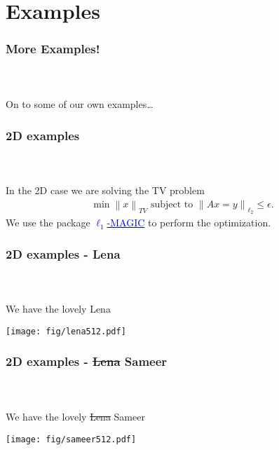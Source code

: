 \documentclass[mathserif,18pt,xcolor=table]{beamer}
\newcommand{\norm}[1]{\left\lVert #1 \right\rVert}
\begin{document}

\section{Examples}


\begin{frame}[t]
\frametitle{More Examples!}
\framesubtitle{~~}  %


On to some of our own examples\dots


\end{frame}




\begin{frame}[t]
\frametitle{2D examples}
\framesubtitle{~~}  %

In the 2D case we are solving the TV problem
\begin{align*}
	\min \norm{x}_{TV} \text{ subject to } \norm{Ax = y}_{\ell_2} \leq \epsilon.
\end{align*}
We use the package \href{http://users.ece.gatech.edu/~justin/l1magic/}{\textcolor{blue}{$\ell_1$-MAGIC}} to perform the optimization.

\end{frame}



\begin{frame}[t]
\frametitle{2D examples - Lena}
\framesubtitle{~~}  %

We have the lovely Lena

\centering
\texttt{[image: fig/lena512.pdf]}

\end{frame}

\begin{frame}[t]
	\frametitle{2D examples - \st{Lena} Sameer}
\framesubtitle{~~}  %

We have the lovely \st{Lena} Sameer

\centering
\texttt{[image: fig/sameer512.pdf]}

\end{frame}
\end{document}

